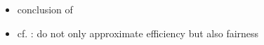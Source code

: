 \begin{itemize}





		\item
		conclusion of \cite{min_envy_and_max_avg_nsw_in_the_alloc_of_indiv_goods}

		\item
		cf. \cite{min_envy_and_max_avg_nsw_in_the_alloc_of_indiv_goods}: do not only approximate efficiency but also fairness
		\begin{itemize}


\end{itemize}
\end{itemize}
